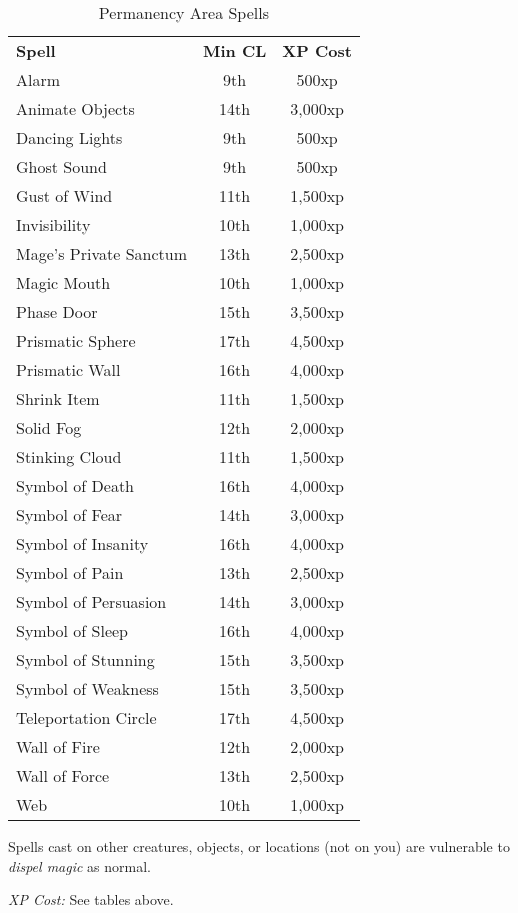 \begin{table}[htb]
\caption{Permanency Area Spells}
\centering
\begin{tabular}{l c c}
\textbf{Spell} & \textbf{Min CL} & \textbf{XP Cost}\\
Alarm & 9th & 500xp\\
Animate Objects & 14th & 3,000xp\\
Dancing Lights & 9th & 500xp\\
Ghost Sound & 9th & 500xp\\
Gust of Wind & 11th & 1,500xp\\
Invisibility & 10th & 1,000xp\\
Mage's Private Sanctum & 13th & 2,500xp\\
Magic Mouth & 10th & 1,000xp\\
Phase Door & 15th & 3,500xp\\
Prismatic Sphere & 17th & 4,500xp\\
Prismatic Wall & 16th & 4,000xp\\
Shrink Item & 11th & 1,500xp\\
Solid Fog & 12th & 2,000xp\\
Stinking Cloud & 11th & 1,500xp\\
Symbol of Death & 16th & 4,000xp\\
Symbol of Fear & 14th & 3,000xp\\
Symbol of Insanity & 16th & 4,000xp\\
Symbol of Pain & 13th & 2,500xp\\
Symbol of Persuasion & 14th & 3,000xp\\
Symbol of Sleep & 16th & 4,000xp\\
Symbol of Stunning & 15th & 3,500xp\\
Symbol of Weakness & 15th & 3,500xp\\
Teleportation Circle & 17th & 4,500xp\\
Wall of Fire & 12th & 2,000xp\\
Wall of Force & 13th & 2,500xp\\
Web & 10th & 1,000xp\\
\end{tabular}
\end{table}

Spells cast on other creatures, objects, or locations (not on you) are vulnerable 
to \textit{dispel magic} as normal.

\textit{XP Cost:} See tables above.


